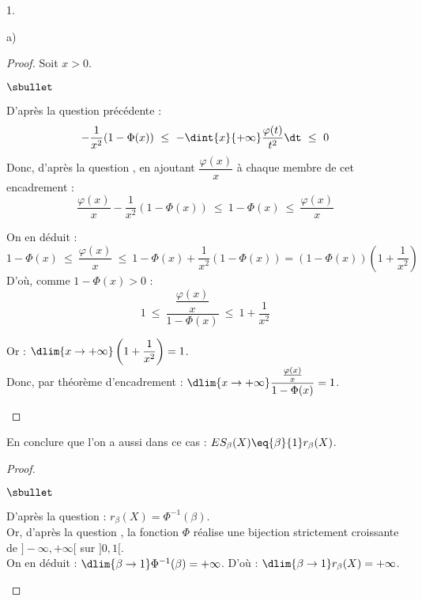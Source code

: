 \begin{noliste}{1.}
\begin{noliste}{a)}
\begin{proof}
      Soit $x>0$.
      \begin{noliste}{$\sbullet$}
	\item D'après la question précédente :
	\[
	  -\dfrac{1}{x^2}(1-\Phi(x)) \ \leq \ - \dint{x}{+\infty}
	  \dfrac{\varphi(t)}{t^2} \dt \ \leq \ 0
	\]
	Donc, d'après la question , en ajoutant $\dfrac{
	\varphi(x)}{x}$ à chaque membre de cet encadrement :
	\[
	  \dfrac{\varphi(x)}{x} - \dfrac{1}{x^2}(1-\Phi(x)) \ \leq \
	  1-\Phi(x) \ \leq \ \dfrac{\varphi(x)}{x}
	\]
	
	\item On en déduit :
	\[
	  1-\Phi(x) \ \leq \ \dfrac{\varphi(x)}{x} \ \leq \
	  1-\Phi(x) + \dfrac{1}{x^2}(1-\Phi(x)) = (1-\Phi(x))
	  \left(1+\dfrac{1}{x^2}\right)
	\]
	D'où, comme $1-\Phi(x) >0$ :
	\[
	  1 \ \leq \ \dfrac{\dfrac{\varphi(x)}{x}}{1-\Phi(x)} \ \leq \
	  1+ \dfrac{1}{x^2}
	\]
	\item Or : $\dlim{x\to +\infty} \left(1+ \dfrac{1}{x^2}\right) 
	=1$.\\
	Donc, par théorème d'encadrement : $\dlim{x\to + \infty} 
	\dfrac{\frac{\varphi(x)}{x}}{1-\Phi(x)}=1$.
	\conc{Ainsi : $1- \Phi(x) \eqx{+\infty} 
	\dfrac{\varphi(x)}{x}$.}~\\[-1.2cm]
      \end{noliste}
    \end{proof}

    
    \item En conclure que l'on a aussi dans ce cas : $ES_\beta(X) 
    \eq{\beta}{1} r_\beta(X)$.
    
    \begin{proof}~
      \begin{noliste}{$\sbullet$}
	\item D'après la question  : $r_\beta(X) = 
	\Phi^{-1}(\beta)$.\\
	Or, d'après la question , la fonction $\Phi$
	réalise une bijection strictement croissante de 
	$]-\infty, +\infty[$ sur $]0,1[$.\\
	On en déduit : $\dlim{\beta \to 1} \Phi^{-1}(\beta)=+\infty$.
	D'où : $\dlim{\beta \to 1} r_\beta(X)=+\infty$.
	
	
	\newpage
	

\end{noliste}
\end{proof}
\end{noliste}
\end{noliste}
